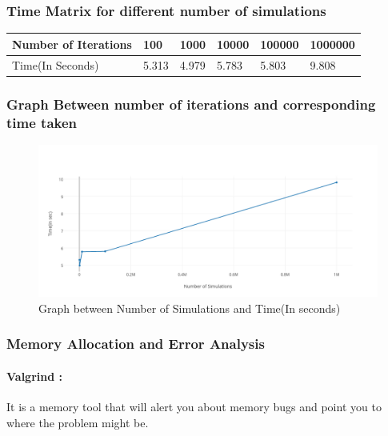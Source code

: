 \documentclass[10pt,a4paper]{article}
\begin{document}
\subsubsection{Time Matrix for different number of simulations}
\begin{tabu} to 1.0\textwidth { | X[l] | X[c] | X[r] | X[l] | X[c] | X[r] |  }
 \hline
 Number of Iterations & 100 & 1000 & 10000 & 100000 & 1000000 \\
 \hline
 Time(In Seconds)  & 5.313  & 4.979 & 5.783 & 5.803 & 9.808  \\
\hline
\end{tabu}

\newpage
\subsubsection{Graph Between number of iterations and corresponding time taken}
\begin{figure}[h]
\centering
\includegraphics[scale=0.3]{Serial_graph}
\caption{Graph between Number of Simulations and Time(In seconds)}
\end{figure}

\subsubsection{Memory Allocation and Error Analysis}
\paragraph{Valgrind :}
It is a memory tool that will alert you about memory bugs and point you to where the problem might be. \\
\end{document}
